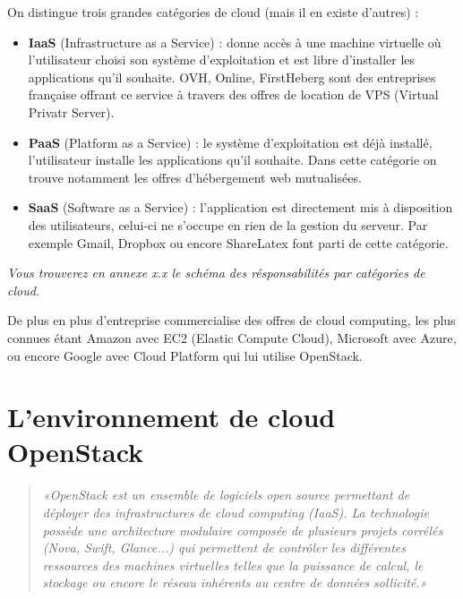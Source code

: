 \documentclass{report}
\begin{document}
    On distingue trois grandes catégories de cloud (mais il en existe d'autres) :\vspace{2 mm}
    \begin{itemize}
        \item \textbf{IaaS} (Infrastructure as a Service) : donne accès à une machine virtuelle où l'utilisateur choisi son système d'exploitation et est libre d'installer les applications qu'il souhaite. OVH, Online, FirstHeberg sont des entreprises française offrant ce service à travers des offres de location de VPS (Virtual Privatr Server).\vspace{2 mm}
        \item \textbf{PaaS} (Platform as a Service) : le système d'exploitation est déjà installé, l'utilisateur installe les applications qu'il souhaite. Dans cette catégorie on trouve notamment les offres d'hébergement web mutualisées.\vspace{2 mm}
        \item \textbf{SaaS} (Software as a Service) : l'application est directement mis à disposition des utilisateurs, celui-ci ne s'occupe en rien de la gestion du serveur. Par exemple Gmail, Dropbox ou encore ShareLatex font parti de cette catégorie.
    \end{itemize}\vspace{2 mm}
    \textit{Vous trouverez en annexe x.x le schéma des résponsabilités par catégories de cloud.}
    \bigbreak
    
    De plus en plus d'entreprise commercialise des offres de cloud computing, les plus connues étant Amazon avec EC2 (Elastic Compute Cloud), Microsoft avec Azure, ou encore Google avec Cloud Platform qui lui utilise OpenStack.
    \bigbreak
    
    \section{L'environnement de cloud OpenStack}

        \begin{quote}
            \textit{«OpenStack est un ensemble de logiciels open source permettant de déployer des infrastructures de cloud computing (IaaS). La technologie possède une architecture modulaire composée de plusieurs projets corrélés (Nova, Swift, Glance...) qui permettent de contrôler les différentes ressources des machines virtuelles telles que la puissance de calcul, le stockage ou encore le réseau inhérents au centre de données sollicité.»
            \cite{wiki_openstack}}
        \end{quote}
        \bigbreak
        
\end{document}
